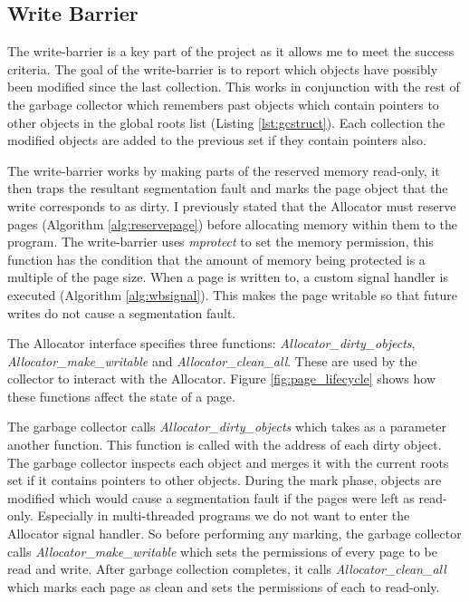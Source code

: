 \documentclass[../diss.tex]{subfiles}
\begin{document}
\subsection{Write Barrier} \label{sec:writebarrier}

The write-barrier is a key part of the project as it allows me to meet the success criteria. The goal of the write-barrier is to report which objects have possibly been modified since the last collection. This works in conjunction with the rest of the garbage collector which remembers past objects which contain pointers to other objects in the global roots list (Listing \ref{lst:gcstruct}). Each collection the modified objects are added to the previous set if they contain pointers also.

The write-barrier works by making parts of the reserved memory read-only, it then traps the resultant segmentation fault and marks the page object that the write corresponds to as dirty. I previously stated that the Allocator must reserve pages (Algorithm \ref{alg:reservepage}) before allocating memory within them to the program. The write-barrier uses \emph{mprotect} to set the memory permission, this function has the condition that the amount of memory being protected is a multiple of the page size. When a page is written to, a custom signal handler is executed (Algorithm \ref{alg:wbsignal}). This makes the page writable so that future writes do not cause a segmentation fault. 

The Allocator interface specifies three functions: \emph{Allocator\_dirty\_objects}, \emph{Allocator\_make\_writable} and \emph{Allocator\_clean\_all}. These are used by the collector to interact with the Allocator. Figure \ref{fig:page_lifecycle} shows how these functions affect the state of a page.

The garbage collector calls \emph{Allocator\_dirty\_objects} which takes as a parameter another function. This function is called with the address of each dirty object. The garbage collector inspects each object and merges it with the current roots set if it contains pointers to other objects. During the mark phase, objects are modified which would cause a segmentation fault if the pages were left as read-only. Especially in multi-threaded programs we do not want to enter the Allocator signal handler. So before performing any marking, the garbage collector calls \emph{Allocator\_make\_writable} which sets the permissions of every page to be read and write. After garbage collection completes, it calls \emph{Allocator\_clean\_all} which marks each page as clean and sets the permissions of each to read-only.
\end{document}
